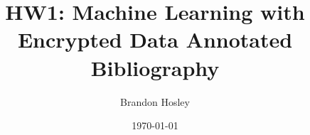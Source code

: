 \documentclass[]{article}
\title{HW1: Machine Learning with Encrypted Data Annotated Bibliography}
\author{Brandon Hosley}
\date{\today}
\begin{document}
	\maketitle
	\nocite{Barni2009,
		Bost2015,	
		Gentry2009,
		Gao2018,
		Lindell2000,
		Paillier1999,
		Yasumura2019}
	
	
\end{document}
